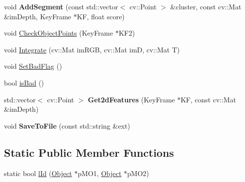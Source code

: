 \begin{DoxyCompactItemize}
\mbox{\label{classObject_ac6b4a93f2ab97692c70c5c54ecc1628e}} 
void {\bfseries Add\+Segment} (const std\+::vector$<$ cv\+::\+Point $>$ \&cluster, const cv\+::\+Mat \&im\+Depth, Key\+Frame $\ast$KF, float score)
\item 
void \hyperlink{classObject_a3f843dde478cc5150746d4bc3a8399f8}{Check\+Object\+Points} (Key\+Frame $\ast$K\+F2)
\item 
void \hyperlink{classObject_a438ac9db297561c832a416b304e40e87}{Integrate} (cv\+::\+Mat im\+R\+GB, cv\+::\+Mat imD, cv\+::\+Mat T)
\item 
void \hyperlink{classObject_a2994e04dbefd498087ad3f5a0ed41057}{Set\+Bad\+Flag} ()
\item 
bool \hyperlink{classObject_a3125138275bf5ab9ea78073b18a4f7c7}{is\+Bad} ()
\item 
\mbox{\label{classObject_a8ef91a15b2f4de4f4ccaeb2020ff2ae0}} 
std\+::vector$<$ cv\+::\+Point $>$ {\bfseries Get2d\+Features} (Key\+Frame $\ast$KF, const cv\+::\+Mat \&im\+Depth)
\item 
\mbox{\label{classObject_a0c56ad377cdad098ae40b9d6117bda7b}} 
void {\bfseries Save\+To\+File} (const std\+::string \&ext)
\end{DoxyCompactItemize}
\subsection*{Static Public Member Functions}
\begin{DoxyCompactItemize}
\item 
static bool \hyperlink{classObject_aae2511e9146551564784a5841e104aac}{l\+Id} (\hyperlink{classObject}{Object} $\ast$p\+M\+O1, \hyperlink{classObject}{Object} $\ast$p\+M\+O2)
\end{DoxyCompactItemize}
